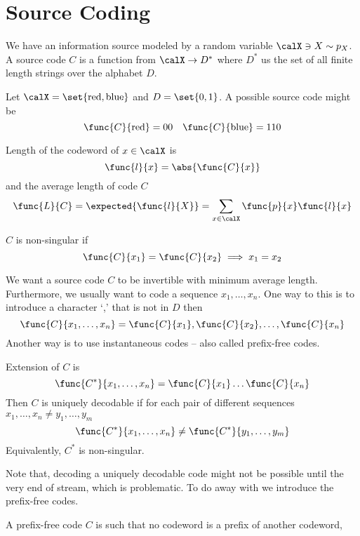 \chapter{Source Coding}
We have an information source modeled by a random variable \(\calX \ni X \sim p_X\). A source code \(C\) is a function from \(\calX \to D^{\ast}\) where \(D^{\ast}\) us the set of all finite length strings over the alphabet \(D\). 
\begin{example}
    Let \(\calX = \set{\text{red}, \text{blue}}\) and \(D = \set{0,1}\). A possible source code might be 
    \begin{equation*}
        \func{C}{\text{red}} = 00 \quad \func{C}{\text{blue}} = 110
    \end{equation*}
\end{example}
\begin{definition}
    Length of the codeword of \(x \in \calX\) is 
    \begin{equation*}
        \func{l}{x} = \abs{\func{C}{x}}
    \end{equation*}
    and the average length of code \(C\) 
    \begin{equation*}
        \func{L}{C} = \expected{\func{l}{X}} = \sum_{x \in \calX} \func{p}{x} \func{l}{x}
    \end{equation*}
\end{definition}

\begin{definition}
    \(C\) is non-singular if 
    \begin{equation*}
        \func{C}{x_1} = \func{C}{x_2} \implies x_1 = x_2
    \end{equation*}
\end{definition}
We want a source code \(C\) to be invertible with minimum average length. Furthermore, we usually want to code a sequence \(x_1, \dots ,x_n\). One way to this is to introduce a character `,' that is not in \(D\) then 
\begin{equation*}
    \func{C}{x_1, \dots , x_n} = \func{C}{x_1}, \func{C}{x_2} , \dots , \func{C}{x_n}
\end{equation*}
Another way is to use instantaneous codes -- also called prefix-free codes.
\begin{definition}
    Extension of \(C\) is 
    \begin{equation*}
        \func{C^{\ast}}{x_1, \dots , x_n} = \func{C}{x_1} \dots \func{C}{x_n}
    \end{equation*}
    Then \(C\) is uniquely decodable if for each pair of different sequences \(x_1,\dots, x_n \neq y_1,\dots , y_m\)
    \begin{equation*}
        \func{C^{\ast}}{x_1,\dots ,x_n} \neq \func{C^{\ast}}{y_1, \dots ,y_m}
    \end{equation*}
    Equivalently, \(C^{\ast}\) is non-singular.
\end{definition}
Note that, decoding a uniquely decodable code might not be possible until the very end of stream, which is problematic. To do away with we introduce the prefix-free codes.
\begin{definition}
    A prefix-free code \(C\) is such that no codeword is a prefix of another codeword, 
\end{definition}

